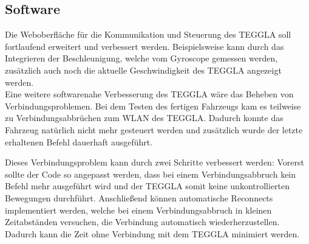 \subsection{Software}

Die Weboberfläche für die Kommunikation und Steuerung des TEGGLA soll fortlaufend erweitert und verbessert werden. 
Beispielsweise kann durch das Integrieren der Beschleunigung, welche vom Gyroscope gemessen werden, zusätzlich auch noch die aktuelle Geschwindigkeit des TEGGLA angezeigt werden.\\

Eine weitere softwarenahe Verbesserung des TEGGLA wäre das Beheben von Verbindungsproblemen. 
Bei dem Testen des fertigen Fahrzeugs kam es teilweise zu Verbindungsabbrüchen zum WLAN des TEGGLA. 
Dadurch konnte das Fahrzeug natürlich nicht mehr gesteuert werden und zusätzlich wurde der letzte erhaltenen Befehl dauerhaft ausgeführt. 

Dieses Verbindungsproblem kann durch zwei Schritte verbessert werden: Vorerst sollte der Code so angepasst werden, dass bei einem Verbindungsabbruch kein Befehl mehr ausgeführt wird und der TEGGLA somit keine unkontrollierten Bewegungen durchführt. 
Anschließend können automatische Reconnects implementiert werden, welche bei einem Verbindungsabbruch in kleinen Zeitabständen versuchen, die Verbindung automatisch wiederherzustellen. 
Dadurch kann die Zeit ohne Verbindung mit dem TEGGLA minimiert werden.

